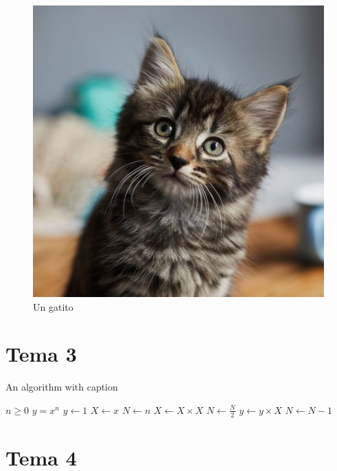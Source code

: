 \begin{figure}[bp!]
	\centering
	\includegraphics[scale=0.38]{Capitulos/Figuras/gatito.jpg}
	\caption{Un gatito}
	\label{gatito}
\end{figure}

\lipsum[8]

\section{Tema 3} %
\lipsum[9-10]

\begin{algorithm}
    \caption{An algorithm with caption}\label{alg:cap}
    \begin{algorithmic}
        \Require $n \geq 0$
        \Ensure $y = x^n$
        \State $y \gets 1$
        \State $X \gets x$
        \State $N \gets n$
            \State $X \gets X \times X$
            \State $N \gets \frac{N}{2}$  
            \State $y \gets y \times X$
            \State $N \gets N - 1$
        \EndIf
        \EndWhile
    \end{algorithmic}
\end{algorithm}
\lipsum[11-13]

\section{Tema 4} %
\lipsum[14-16]

